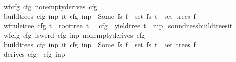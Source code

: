 \begin{isabellebody}
\ \ \ {\isachardoublequoteopen}wf{\isacharunderscore}{\kern0pt}cfg\ cfg{\isachardoublequoteclose}\ {\isachardoublequoteopen}nonempty{\isacharunderscore}{\kern0pt}derives\ cfg{\isachardoublequoteclose}\isanewline
\ \ \ {\isachardoublequoteopen}build{\isacharunderscore}{\kern0pt}trees\ cfg\ inp\ {\isacharparenleft}{\kern0pt}{\isasymII}{\isacharunderscore}{\kern0pt}it\ cfg\ inp{\isacharparenright}{\kern0pt}\ {\isacharequal}{\kern0pt}\ Some\ fs{\isachardoublequoteclose}\ {\isachardoublequoteopen}f\ {\isasymin}\ set\ fs{\isachardoublequoteclose}\ {\isachardoublequoteopen}t\ {\isasymin}\ set\ {\isacharparenleft}{\kern0pt}trees\ f{\isacharparenright}{\kern0pt}{\isachardoublequoteclose}\isanewline
\ \ \ {\isachardoublequoteopen}wf{\isacharunderscore}{\kern0pt}rule{\isacharunderscore}{\kern0pt}tree\ cfg\ t\ {\isasymand}\ root{\isacharunderscore}{\kern0pt}tree\ t\ {\isacharequal}{\kern0pt}\ {\isasymSS}\ cfg\ {\isasymand}\ yield{\isacharunderscore}{\kern0pt}tree\ t\ {\isacharequal}{\kern0pt}\ inp{\isachardoublequoteclose}%
\isadelimproof
%
\endisadelimproof
%
\isatagproof
%
\endisatagproof
{\isafoldproof}%
%
\isadelimproof
\isanewline
%
\endisadelimproof
{}\isamarkupfalse%
\ soundness{\isacharunderscore}{\kern0pt}build{\isacharunderscore}{\kern0pt}trees{\isacharunderscore}{\kern0pt}{\isasymII}{\isacharunderscore}{\kern0pt}it{\isacharcolon}{\kern0pt}\isanewline
\ \ \ {\isachardoublequoteopen}wf{\isacharunderscore}{\kern0pt}cfg\ cfg{\isachardoublequoteclose}\ {\isachardoublequoteopen}is{\isacharunderscore}{\kern0pt}word\ cfg\ inp{\isachardoublequoteclose}\ {\isachardoublequoteopen}nonempty{\isacharunderscore}{\kern0pt}derives\ cfg{\isachardoublequoteclose}\isanewline
\ \ \ {\isachardoublequoteopen}build{\isacharunderscore}{\kern0pt}trees\ cfg\ inp\ {\isacharparenleft}{\kern0pt}{\isasymII}{\isacharunderscore}{\kern0pt}it\ cfg\ inp{\isacharparenright}{\kern0pt}\ {\isacharequal}{\kern0pt}\ Some\ fs{\isachardoublequoteclose}\ {\isachardoublequoteopen}f\ {\isasymin}\ set\ fs{\isachardoublequoteclose}\ {\isachardoublequoteopen}t\ {\isasymin}\ set\ {\isacharparenleft}{\kern0pt}trees\ f{\isacharparenright}{\kern0pt}{\isachardoublequoteclose}\isanewline
\ \ \ {\isachardoublequoteopen}derives\ cfg\ {\isacharbrackleft}{\kern0pt}{\isasymSS}\ cfg{\isacharbrackright}{\kern0pt}\ inp{\isachardoublequoteclose}%
\isadelimproof
%
\endisadelimproof
%
\isatagproof
%
\endisatagproof
{\isafoldproof}%
%
\isadelimproof
\isanewline
%
\endisadelimproof
{}\isamarkupfalse%

\end{isabellebody}
